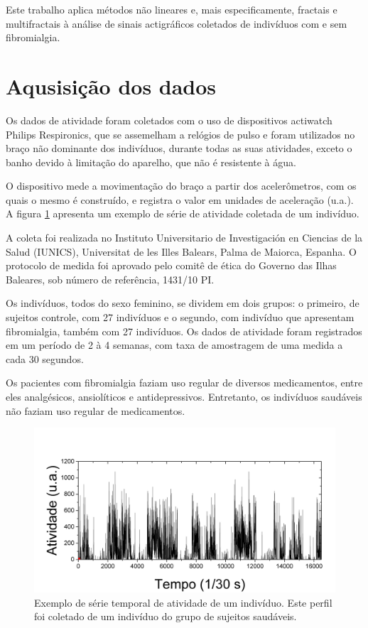\documentclass{ufscThesis}
\begin{document}
Este trabalho aplica métodos não lineares e, mais especificamente, fractais e multifractais à análise de sinais actigráficos coletados de indivíduos com e sem fibromialgia. 

\section{Aqusisição dos dados}
Os dados de atividade foram coletados com o uso de dispositivos actiwatch Philips Respironics, que se assemelham a relógios de pulso e foram utilizados no braço não dominante dos indivíduos, durante todas as suas atividades, exceto o banho devido à limitação do aparelho, que não é resistente à água. \par
O dispositivo mede a movimentação do braço a partir dos acelerômetros, com os quais o mesmo é construído, e registra o valor em unidades de aceleração (u.a.). A figura \ref{actiwatch} apresenta um exemplo de série de atividade coletada de um indivíduo.\par
A coleta foi realizada no Instituto Universitario de Investigación en Ciencias de la Salud (IUNICS), Universitat de les Illes Balears, Palma de Maiorca, Espanha. O protocolo de medida foi aprovado pelo comitê de ética do Governo das Ilhas Baleares, sob número de referência, 1431/10
PI. \par
Os indivíduos, todos do sexo feminino, se dividem em dois grupos: o primeiro, de sujeitos controle, com 27 indivíduos e o segundo, com indivíduo que apresentam fibromialgia, também com 27 indivíduos. Os dados de atividade foram registrados em um período de 2 à 4 semanas, com taxa de amostragem de uma medida a cada 30 segundos. \par
Os pacientes com fibromialgia faziam uso regular de diversos medicamentos, entre eles analgésicos, ansiolíticos e antidepressivos. Entretanto, os indivíduos saudáveis não faziam uso regular de medicamentos.\par


\begin{figure}[!h]
\centering
\includegraphics[scale=0.25]{actiwatch.png}
\caption{Exemplo de série temporal de atividade de um indivíduo. Este perfil foi coletado de um indivíduo do grupo de sujeitos saudáveis.}
\label{actiwatch}
\end{figure}
\end{document}
